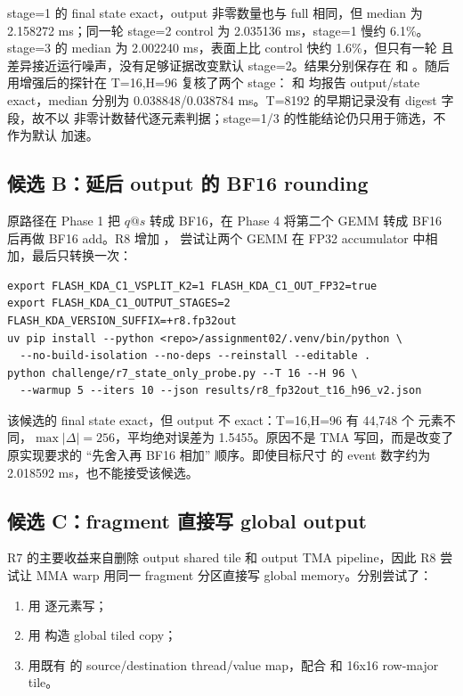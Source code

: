 stage=1 的 final state exact，output 非零数量也与 full 相同，但 median 为
2.158272 ms；同一轮 stage=2 control 为 2.035136 ms，stage=1 慢约 6.1\%。
stage=3 的 median 为 2.002240 ms，表面上比 control 快约 1.6\%，但只有一轮
且差异接近运行噪声，没有足够证据改变默认 stage=2。结果分别保存在
 和
。随后用增强后的探针在 T=16,H=96
复核了两个 stage： 和
 均报告 output/state exact，median
分别为 0.038848/0.038784 ms。T=8192 的早期记录没有 digest 字段，故不以
非零计数替代逐元素判据；stage=1/3 的性能结论仍只用于筛选，不作为默认
加速。

\subsection{候选 B：延后 output 的 BF16 rounding}

原路径在 Phase 1 把 \(q@s\) 转成 BF16，在 Phase 4 将第二个 GEMM 转成
BF16 后再做 BF16 add。R8 增加 ，
尝试让两个 GEMM 在 FP32 accumulator 中相加，最后只转换一次：

\begin{lstlisting}
export FLASH_KDA_C1_VSPLIT_K2=1 FLASH_KDA_C1_OUT_FP32=true
export FLASH_KDA_C1_OUTPUT_STAGES=2 FLASH_KDA_VERSION_SUFFIX=+r8.fp32out
uv pip install --python <repo>/assignment02/.venv/bin/python \
  --no-build-isolation --no-deps --reinstall --editable .
python challenge/r7_state_only_probe.py --T 16 --H 96 \
  --warmup 5 --iters 10 --json results/r8_fp32out_t16_h96_v2.json
\end{lstlisting}

该候选的 final state exact，但 output 不 exact：T=16,H=96 有 44,748 个
元素不同，\(\max|\Delta|=256\)，平均绝对误差为 1.5455。原因不是 TMA
写回，而是改变了原实现要求的 ``先舍入再 BF16 相加'' 顺序。即使目标尺寸
的 event 数字约为 2.018592 ms，也不能接受该候选。

\subsection{候选 C：fragment 直接写 global output}

R7 的主要收益来自删除 output shared tile 和 output TMA pipeline，因此 R8
尝试让 MMA warp 用同一 fragment 分区直接写 global memory。分别尝试了：

\begin{enumerate}
  \item 用  逐元素写；
  \item 用  构造 global tiled copy；
  \item 用既有 \code{smem\_tiled\_store\_C} 的 source/destination
        thread/value map，配合 \code{idx2crd} 和 16x16 row-major tile。
\end{enumerate}

